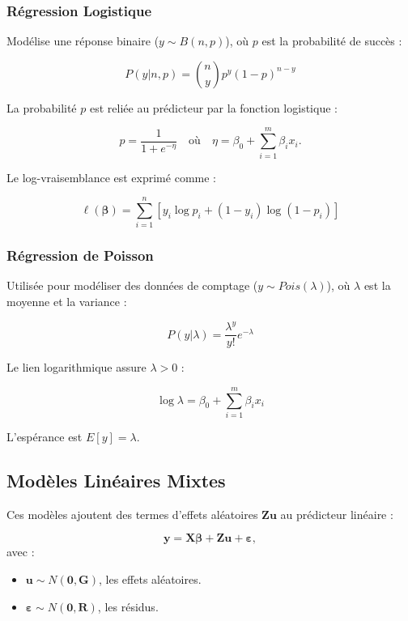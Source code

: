 \subsubsection{Régression Logistique}\label{ruxe9gression-logistique}

Modélise une réponse binaire (\(y \sim B(n, p)\)), où \(p\) est la
probabilité de succès :

\[ P(y | n, p) = \binom{n}{y} p^y (1-p)^{n-y} \]

La probabilité \(p\) est reliée au prédicteur par la fonction logistique
:

\[ p = \frac{1}{1 + e^{-\eta}} \quad \text{où} \quad \eta = \beta_0 + \sum_{i=1}^m \beta_i x_i. \]

Le log-vraisemblance est exprimé comme :

\[ \ell(\boldsymbol{\beta}) = \sum_{i=1}^n \left[ y_i \log{p_i} + (1-y_i) \log{(1-p_i)} \right] \]

\subsubsection{Régression de Poisson}\label{ruxe9gression-de-poisson}

Utilisée pour modéliser des données de comptage
(\(y \sim Pois(\lambda)\)), où \(\lambda\) est la moyenne et la variance
:

\[ P(y | \lambda) = \frac{\lambda^y}{y!} e^{-\lambda} \]

Le lien logarithmique assure \(\lambda > 0\) :

\[ \log{\lambda} = \beta_0 + \sum_{i=1}^m \beta_i x_i \]

L'espérance est \(E[y] = \lambda\).

\subsection{Modèles Linéaires
Mixtes}\label{moduxe8les-linuxe9aires-mixtes}

Ces modèles ajoutent des termes d'effets aléatoires
\(\mathbf{Z} \mathbf{u}\) au prédicteur linéaire :

\[ \mathbf{y} = \mathbf{X} \boldsymbol{\beta} + \mathbf{Z} \mathbf{u} + \boldsymbol{\varepsilon}, \]
avec :

\begin{itemize}
\item
  \(\mathbf{u} \sim N(\mathbf{0}, \mathbf{G})\), les effets aléatoires.
\item
  \(\boldsymbol{\varepsilon} \sim N(\mathbf{0}, \mathbf{R})\), les
  résidus.
\end{itemize}

